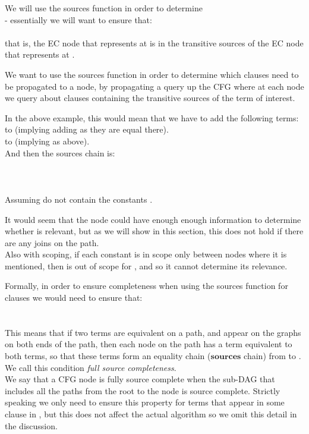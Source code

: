 We will use the sources function in order to determine \\
 - essentially we will want to ensure that:\\
\\
that is, the EC node that represents  at  is in the transitive sources of the EC node that represents 
 at .

We want to use the sources function in order to determine which clauses need to be propagated to a node, 
by propagating a query up the CFG where at each node we query about clauses containing the transitive sources of the term of interest.

In the above example, this would mean that we have to add the following terms:\\
 to  (implying adding  as they are equal there).\\
 to  (implying  as above).\\
And then the sources chain is:\\
 \\
 \\
 \\
Assuming  do not contain the constants .

It would seem that the node  could have enough enough information to determine whether  is relevant, 
but as we will show in this section, this does not hold if there are any joins on the path.\\
Also with scoping, if each constant is in scope only between nodes where it is mentioned, 
then  is out of scope for , and so it cannot determine its relevance.

Formally, in order to ensure completeness when using the sources function for clauses we would need to ensure that:\\
\\
\\
This means that if two terms are equivalent on a path, and appear on the graphs on both ends of the path, then each node on the path has a term equivalent to both terms, so that these terms form an equality chain ($\mathbf{sources}$ chain) from  to .\\
We call this condition \emph{full source completeness}.\\
We say that a CFG node is fully source complete when the sub-DAG that includes all the paths from the root to the node is source complete.
Strictly speaking we only need to ensure this property for terms  that appear in some clause in , 
but this does not affect the actual algorithm so we omit this detail in the discussion.


